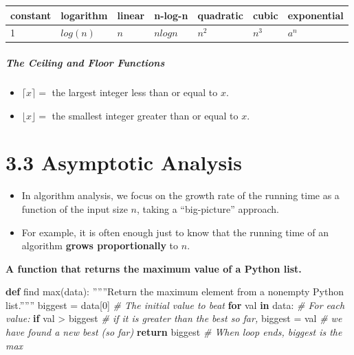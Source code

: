 \documentclass[11pt]{article}
\providecommand{\tightlist}{%
      \setlength{\itemsep}{0pt}\setlength{\parskip}{0pt}}
\newenvironment{Shaded}{}{}
\newcommand{\KeywordTok}[1]{\textcolor[rgb]{0.00,0.44,0.13}{\textbf{{#1}}}}
\newcommand{\DecValTok}[1]{\textcolor[rgb]{0.25,0.63,0.44}{{#1}}}
\newcommand{\CommentTok}[1]{\textcolor[rgb]{0.38,0.63,0.69}{\textit{{#1}}}}
\newcommand{\NormalTok}[1]{{#1}}
\newcommand{\ImportTok}[1]{{#1}}
\newcommand{\ControlFlowTok}[1]{\textcolor[rgb]{0.00,0.44,0.13}{\textbf{{#1}}}}
\newcommand{\OperatorTok}[1]{\textcolor[rgb]{0.40,0.40,0.40}{{#1}}}
\newcommand{\BuiltInTok}[1]{{#1}}
\begin{document}
    \begin{longtable}[]{@{}lllllll@{}}
\toprule
constant & logarithm & linear & n-log-n & quadratic & cubic &
exponential \\
\midrule
\endhead
1 & \(log(n)\) & \(n\) & \(nlogn\) & \(n^2\) & \(n^3\) & \(a^n\) \\
\bottomrule
\end{longtable}

    \hypertarget{the-ceiling-and-floor-functions}{%
\subparagraph{The Ceiling and Floor
Functions}\label{the-ceiling-and-floor-functions}}

\begin{itemize}
\tightlist
\item
  \(\lceil x \rceil =\) the largest integer less than or equal to \(x\).
\item
  \(\lfloor x \rfloor =\) the smallest integer greater than or equal to
  \(x\).
\end{itemize}

    \hypertarget{asymptotic-analysis}{%
\section{3.3 Asymptotic Analysis}\label{asymptotic-analysis}}

\begin{itemize}
\tightlist
\item
  In algorithm analysis, we focus on the growth rate of the running time
  as a function of the input size \(n\), taking a ``big-picture''
  approach.
\item
  For example, it is often enough just to know that the running time of
  an algorithm \textbf{grows proportionally} to \(n\).
\end{itemize}

    \textbf{A function that returns the maximum value of a Python list.}

\begin{Shaded}
\begin{Highlighting}[]
\KeywordTok{def}\NormalTok{ find }\BuiltInTok{max}\NormalTok{(data):}
\NormalTok{”””Return the maximum element }\ImportTok{from}\NormalTok{ a nonempty Python }\BuiltInTok{list}\NormalTok{.””” }
\NormalTok{biggest }\OperatorTok{=}\NormalTok{ data[}\DecValTok{0}\NormalTok{]                       }\CommentTok{\# The initial value to beat}
\ControlFlowTok{for}\NormalTok{ val }\KeywordTok{in}\NormalTok{ data:                        }\CommentTok{\# For each value:}
 \ControlFlowTok{if}\NormalTok{ val }\OperatorTok{\textgreater{}}\NormalTok{ biggest                       }\CommentTok{\# if it is greater than the best so far,}
\NormalTok{        biggest }\OperatorTok{=}\NormalTok{ val                  }\CommentTok{\# we have found a new best (so far)         }
 \ControlFlowTok{return}\NormalTok{ biggest                        }\CommentTok{\# When loop ends, biggest is the max}
\end{Highlighting}
\end{Shaded}
\end{document}
